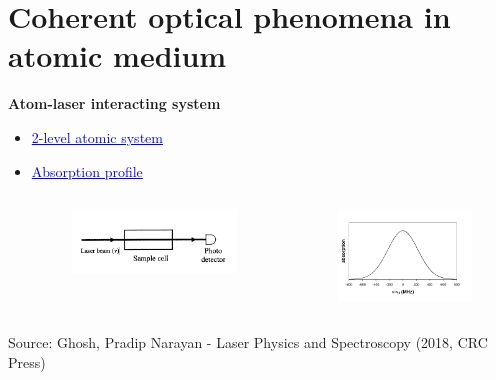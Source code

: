 \documentclass[9pt,aspectratio94]{beamer}
\begin{document}
\section{\textbf{Coherent optical phenomena in atomic medium}}
\begin{frame} {\textbf{Atom-laser interacting system}}
\begin{itemize}
\item \textcolor{blue}{\underline{2-level atomic system}}
    \begin{figure}
        \centering
          \label{fig:figure 1}
          
   \end{figure}
\item   \textcolor{blue}{\underline{Absorption profile}}   
\begin{columns}
    
\begin{figure}
\includegraphics[scale=0.35]{absorption.png}
\end{figure}
\begin{figure}
\includegraphics[scale=0.35]{simple.png}
\end{figure}
\end{columns}
\end{itemize}
\tiny{Source: Ghosh, Pradip Narayan - Laser Physics and Spectroscopy (2018, CRC Press)}
\end{frame}
\end{document}
